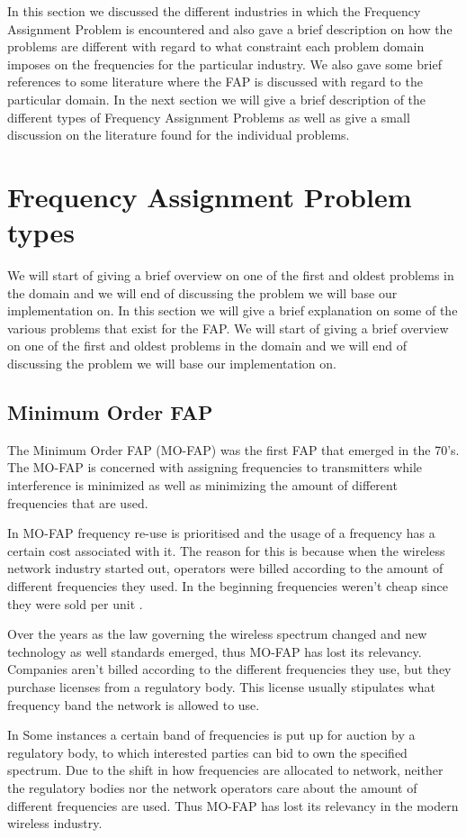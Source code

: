 In this section we discussed the different industries in which the Frequency Assignment Problem is encountered and also gave a brief description on how the problems are different with regard to what constraint each problem domain imposes on the frequencies for the particular industry. 
We also gave some brief references to some literature where the FAP is discussed with regard to the particular domain. In the next section we will give a brief description of the different types of Frequency Assignment Problems as well as give a small discussion on the literature found for the individual problems.
\section{Frequency Assignment Problem types}
\label{sec:FAPVariants}
We will start of giving a brief overview on one of the first and oldest problems in the domain and we  will end of discussing the problem we will base our implementation on. In this section we will give a brief explanation on some of the various problems that exist for the FAP. We will start of giving a brief overview on one of the first and oldest problems in the domain and we  will end of discussing the problem we will base our implementation on.
\subsection{Minimum Order FAP}
The Minimum Order FAP (MO-FAP) was the first FAP that emerged in the 70's. The MO-FAP is concerned with assigning frequencies to transmitters while interference is minimized as well as minimizing the amount of different frequencies that are used. 

In MO-FAP frequency re-use is prioritised and the usage of a frequency has a certain cost associated with it. The reason for this is because when the wireless network industry started out, operators were billed according to the amount of different frequencies they used. In the beginning frequencies weren't cheap since they were sold per unit \cite{Karen2004,MontemanniThesis}. 

Over the years as the law governing the wireless spectrum changed and new technology as well standards emerged, thus MO-FAP has lost its relevancy. Companies aren't billed according to the different frequencies they use, but they purchase licenses from a regulatory body. This license usually stipulates what frequency band the network is allowed to use.

In Some instances a certain band of frequencies is put up for auction by a regulatory body, to which interested parties can bid to own the specified spectrum. Due to the shift in how frequencies are allocated to network, neither the regulatory bodies nor the network operators care about the amount of different frequencies are used. Thus MO-FAP has lost its relevancy in the modern wireless industry.
